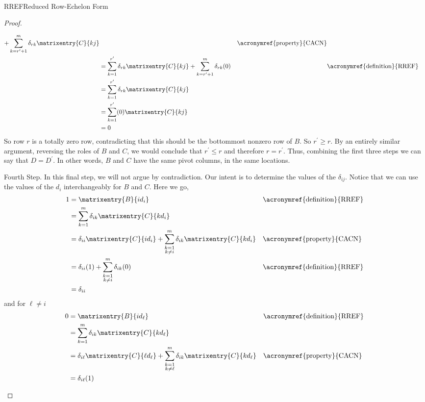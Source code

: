 \begin{subsect}{RREF}{Reduced Row-Echelon Form}
\begin{proof}
\begin{para}
\begin{align*}
+
\sum_{k=r^\prime+1}^{m}\delta_{rk}\matrixentry{C}{kj}
&&\text{\acronymref{property}{CACN}}\\
%
&=
\sum_{k=1}^{r^\prime}\delta_{rk}\matrixentry{C}{kj}
+
\sum_{k=r^\prime+1}^{m}\delta_{rk}(0)
&&\text{\acronymref{definition}{RREF}}\\
%
&=\sum_{k=1}^{r^\prime}\delta_{rk}\matrixentry{C}{kj}\\
%
&=\sum_{k=1}^{r^\prime}(0)\matrixentry{C}{kj}\\
%
&=0
\end{align*}
%
So row $r$ is a totally zero row, contradicting that this should be the bottommost nonzero row of $B$.  So $r^\prime\geq r$.  By an entirely similar argument, reversing the roles of $B$ and $C$, we would conclude that $r^\prime\leq r$ and therefore $r=r^\prime$.  Thus, combining the first three steps we can say that $D=D^\prime$.  In other words, $B$ and $C$ have the same pivot columns, in the same locations.\end{para}
%
\begin{para}
Fourth Step.  In this final step, we will not argue by contradiction.  Our intent is to determine the values of the $\delta_{ij}$.  Notice that we can use the values of the $d_i$ interchangeably for $B$ and $C$.  Here we go,
%
\begin{align*}
1
&=\matrixentry{B}{id_i}
&&\text{\acronymref{definition}{RREF}}\\
%
&=\sum_{k=1}^{m}\delta_{ik}\matrixentry{C}{kd_i}\\
%
&=
\delta_{ii}\matrixentry{C}{id_i}
+
\sum_{\substack{k=1\\k\neq i}}^{m}\delta_{ik}\matrixentry{C}{kd_i}
&&\text{\acronymref{property}{CACN}}\\
%
&=
\delta_{ii}(1)
+
\sum_{\substack{k=1\\k\neq i}}^{m}\delta_{ik}(0)
&&\text{\acronymref{definition}{RREF}}\\
%
&=\delta_{ii}
%
\end{align*}
%
and for $\ell\neq i$
%
\begin{align*}
0
&=\matrixentry{B}{id_\ell}
&&\text{\acronymref{definition}{RREF}}\\
%
&=\sum_{k=1}^{m}\delta_{ik}\matrixentry{C}{kd_\ell}\\
%
%
&=
\delta_{i\ell}\matrixentry{C}{\ell d_\ell}
+
\sum_{\substack{k=1\\k\neq\ell}}^{m}\delta_{ik}\matrixentry{C}{kd_\ell}
&&\text{\acronymref{property}{CACN}}\\
%
&=
\delta_{i\ell}(1)

\end{align*}
\end{para}
\end{proof}
\end{subsect}
